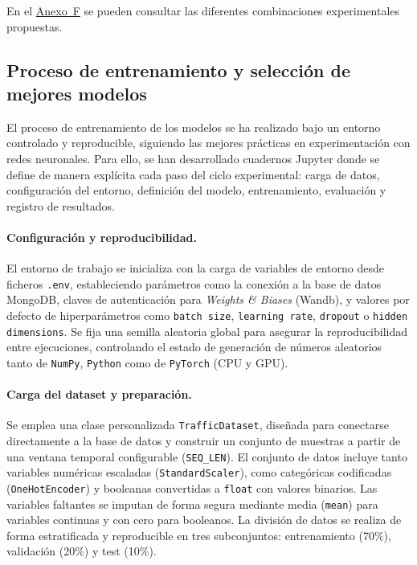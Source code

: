 En el \hyperref[anexo:combinaciones_exp]{Anexo~F} se pueden consultar las diferentes combinaciones experimentales propuestas.

\subsection{Proceso de entrenamiento y selección de mejores modelos}
\label{sec:entrenamiento_mej_modelos}

El proceso de entrenamiento de los modelos se ha realizado bajo un entorno controlado y reproducible, siguiendo las mejores prácticas en experimentación con redes neuronales. Para ello, se han desarrollado cuadernos Jupyter donde se define de manera explícita cada paso del ciclo experimental: carga de datos, configuración del entorno, definición del modelo, entrenamiento, evaluación y registro de resultados.

\paragraph{Configuración y reproducibilidad.}  
El entorno de trabajo se inicializa con la carga de variables de entorno desde ficheros \texttt{.env}, estableciendo parámetros como la conexión a la base de datos MongoDB, claves de autenticación para \textit{Weights \& Biases} (Wandb), y valores por defecto de hiperparámetros como \texttt{batch size}, \texttt{learning rate}, \texttt{dropout} o \texttt{hidden dimensions}. Se fija una semilla aleatoria global para asegurar la reproducibilidad entre ejecuciones, controlando el estado de generación de números aleatorios tanto de \texttt{NumPy}, \texttt{Python} como de \texttt{PyTorch} (CPU y GPU).

\paragraph{Carga del dataset y preparación.}  
Se emplea una clase personalizada \texttt{TrafficDataset}, diseñada para conectarse directamente a la base de datos y construir un conjunto de muestras a partir de una ventana temporal configurable (\texttt{SEQ\_LEN}). El conjunto de datos incluye tanto variables numéricas escaladas (\texttt{StandardScaler}), como categóricas codificadas (\texttt{OneHotEncoder}) y booleanas convertidas a \texttt{float} con valores binarios. Las variables faltantes se imputan de forma segura mediante media (\texttt{mean}) para variables continuas y con cero para booleanos. La división de datos se realiza de forma estratificada y reproducible en tres subconjuntos: entrenamiento (70\%), validación (20\%) y test (10\%).


